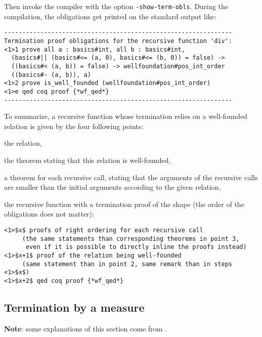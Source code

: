 Then invoke the {\focalizec} compiler with the option {\tt -show-term-obls}.
During the compilation, the obligations get printed on the standard output
like:

\noindent
{\scriptsize
\begin{verbatim}
---------------------------------------------------------------
Termination proof obligations for the recursive function 'div':
<1>1 prove all a : basics#int, all b : basics#int,
  (basics#|| (basics#<= (a, 0), basics#<= (b, 0)) = false) ->
  ((basics#< (a, b)) = false) -> wellfoundation#pos_int_order
  ((basics#- (a, b)), a)
<1>2 prove is_well_founded (wellfoundation#pos_int_order)
<1>e qed coq proof {*wf_qed*}
---------------------------------------------------------------
\end{verbatim}
}

To summarize, a recursive function whose termination relies on a well-founded
relation is given by the four following points:

\begin{compact-enumerate}
\item the relation,
\item the theorem stating that this relation is well-founded,
\item a theorem for each recursive call, stating that the arguments
  of the recursive calls are smaller than the initial arguments
  according to the given relation,
\item the recursive function with a termination proof of the shape
  (the order of the obligations does not matter):
  \noindent
  {\scriptsize
  \begin{lstlisting}[mathescape=true,frame=none]
<1>$x$ proofs of right ordering for each recursive call
     (the same statements than corresponding theorems in point 3,
      even if it is possible to directly inline the proofs instead)
<1>$x+1$ proof of the relation being well-founded
     (same statement than in point 2, same remark than in steps <1>$x$)
<1>$x+2$ qed coq proof {*wf_qed*}
  \end{lstlisting}
  }
\end{compact-enumerate}



\subsection{Termination by a measure}
{\bf Note}: some explanations of this section come from
\cite{Dubois-Pessaux-termproofs}.

